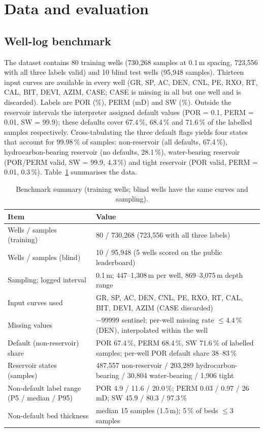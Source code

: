 \documentclass[preprint,12pt]{elsarticle}
\begin{document}
\section{Data and evaluation}
\label{sec:data}

\subsection{Well-log benchmark}

The dataset contains 80 training wells (730,268 samples at 0.1\,m spacing, 723,556 with all three labels valid) and 10 blind test wells (95,948 samples). Thirteen input curves are available in every well (GR, SP, AC, DEN, CNL, PE, RXO, RT, CAL, BIT, DEVI, AZIM, CASE; CASE is missing in all but one well and is discarded). Labels are POR (\%), PERM (mD) and SW (\%). Outside the reservoir intervals the interpreter assigned default values (POR = 0.1, PERM = 0.01, SW = 99.9); these defaults cover 67.4\,\%, 68.4\,\% and 71.6\,\% of the labelled samples respectively. Cross-tabulating the three default flags yields four states that account for 99.98\,\% of samples: non-reservoir (all defaults, 67.4\,\%), hydrocarbon-bearing reservoir (no defaults, 28.1\,\%), water-bearing reservoir (POR/PERM valid, SW = 99.9, 4.3\,\%) and tight reservoir (POR valid, PERM = 0.01, 0.3\,\%). Table~\ref{tab:data} summarises the data.

\begin{table}[t]
\centering
\caption{Benchmark summary (training wells; blind wells have the same curves and sampling).}
\label{tab:data}
\small
\begin{tabular}{p{} p{}}
\toprule
Item & Value \\
\midrule
Wells / samples (training) & 80 / 730,268 (723,556 with all three labels) \\
Wells / samples (blind) & 10 / 95,948 (5 wells scored on the public leaderboard) \\
Sampling; logged interval & 0.1\,m; 447--1,308\,m per well, 869--3,075\,m depth range \\
Input curves used & GR, SP, AC, DEN, CNL, PE, RXO, RT, CAL, BIT, DEVI, AZIM (CASE discarded) \\
Missing values & $-99999$ sentinel; per-well missing rate $\le 4.4\,\%$ (DEN), interpolated within the well \\
Default (non-reservoir) share & POR 67.4\,\%, PERM 68.4\,\%, SW 71.6\,\% of labelled samples; per-well POR default share 38--83\,\% \\
Reservoir states (samples) & 487,557 non-reservoir / 203,289 hydrocarbon-bearing / 30,804 water-bearing / 1,906 tight \\
Non-default label range (P5 / median / P95) & POR 4.9 / 11.6 / 20.0\,\%; PERM 0.03 / 0.97 / 26\,mD; SW 45.9 / 80.3 / 97.3\,\% \\
Non-default bed thickness & median 15 samples (1.5\,m); 5\,\% of beds $\le 3$ samples \\
\bottomrule
\end{tabular}
\end{table}
\end{document}
